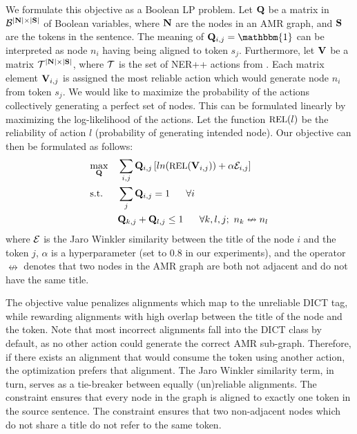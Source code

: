 We formulate this objective as a Boolean LP problem.
Let $\mathbf{Q}$ be a matrix in $\mathcal{B}^{|\mathbf{N}| \times |\mathbf{S}|}$ of Boolean variables,
  where $\mathbf{N}$ are the 
  nodes in an AMR graph, and $\mathbf{S}$ are the tokens in the sentence.
The meaning of $\bQ_{i,j} = \mathbbm{1}$ can be interpreted as node 
  $n_i$ having being aligned to token $s_j$.
Furthermore, let $\mathbf{V}$ be a matrix $\mathcal{T}^{|\mathbf{N}| \times |\mathbf{S}|}$, where
  $\mathcal{T}$ is the set of NER++ actions from .
Each matrix element $\mathbf{V}_{i,j}$ is assigned the most reliable action which would
  generate node $n_i$ from token $s_j$.
We would like to maximize the probability of the actions collectively generating a perfect set of nodes.
This can be formulated linearly by maximizing the log-likelihood of the actions.
Let the function $\textrm{\small{REL}}(l)$ be the reliability of action $l$ (probability of generating intended node).
Our objective can then be formulated as follows:
\begin{align}
  \label{eqn:objective}
  & \underset{\bQ}{\textrm{max}}
     & & \sum_{i,j} \bQ_{i,j} \left[ 
         ln(\textrm{\small{REL}}(\bV_{i,j}))
         + \alpha \sE_{i,j} \right] \\
  \label{eqn:constraint1}
  & \textrm{s.t.}
     & & \sum_{j} \bQ_{i,j} = 1 ~~~~~ \forall i \\
  \label{eqn:constraint2}
  & & & \bQ_{k,j} + \bQ_{l,j} \leq 1 ~~~~~ \forall k,l,j; ~ n_k \nleftrightarrow n_l
\end{align}
where $\mathcal{E}$ is the Jaro Winkler similarity between the title of the node $i$ and the
  token $j$, $\alpha$ is a hyperparameter (set to 0.8 in our experiments),
  and the operator $\nleftrightarrow$ denotes that two nodes in the AMR graph are
  both not adjacent and do not have the same title.

The objective value penalizes alignments which map to the unreliable DICT tag,
  while rewarding alignments with high overlap between the title of the node and
  the token.
Note that most incorrect alignments fall into the DICT class by default, as no other
  action could generate the correct AMR sub-graph.
Therefore, if there exists an alignment that would consume the token using another
  action, the optimization prefers that alignment.
The Jaro Winkler similarity term, in turn, serves as a tie-breaker between equally
  (un)reliable alignments.
The constraint  ensures that every node in the graph is
  aligned to exactly one token in the source sentence.
The constraint  ensures that two non-adjacent nodes which do
  not share a title do not refer to the same token.

